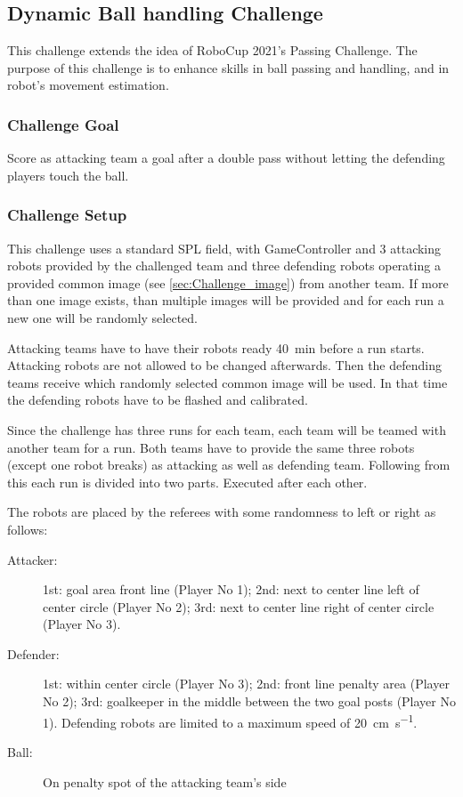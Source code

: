 \clearpage
\newpage

\subsection{Dynamic Ball handling Challenge}

    This challenge extends the idea of RoboCup 2021's Passing Challenge. The purpose of this challenge is to enhance skills in ball passing and handling, and in robot's movement estimation.

    \subsubsection{Challenge Goal}

        Score as attacking team a goal after a double pass without letting the defending players touch the ball.

    \subsubsection{Challenge Setup}

        This challenge uses a standard SPL field, with GameController and 3 attacking robots provided by the challenged team and three defending robots operating a provided common image (see \cref{sec:Challenge_image}) from another team. If more than one image exists, than multiple images will be provided and for each run a new one will be randomly selected.

        Attacking teams have to have their robots ready \qty{40}{\minute} before a run starts. Attacking robots are not allowed to be changed afterwards. Then the defending teams receive which randomly selected common image will be used. In that time the defending robots have to be flashed and calibrated.

        Since the challenge has three runs for each team, each team will be teamed with another team for a run. Both teams have to provide the same three robots (except one robot breaks) as attacking as well as defending team. Following from this each run is divided into two parts. Executed after each other.

        The robots are placed by the referees with some randomness to left or right as follows:

        \begin{description}
            \item[Attacker:] 1st: goal area front line (Player No 1); 2nd: next to center line left of center circle (Player No 2); 3rd: next to center line right of center circle (Player No 3).
            \item[Defender:] 1st: within center circle (Player No 3); 2nd: front line penalty area (Player No 2); 3rd: goalkeeper in the middle between the two goal posts (Player No 1). Defending robots are limited to a maximum speed of \qty{20}{\cm \per \second}.
            \item[Ball:] On penalty spot of the attacking team's side
        \end{description}

